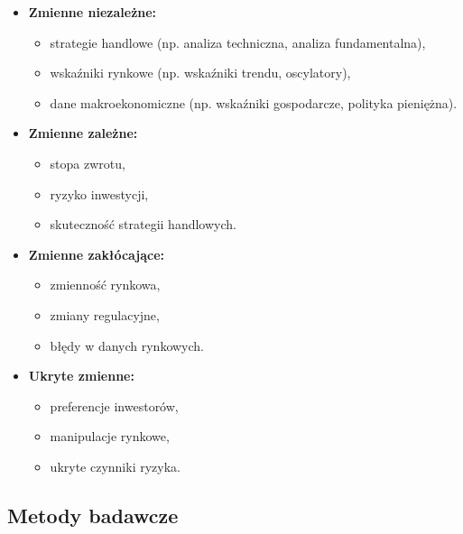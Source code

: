 \documentclass[polish,envcountsect,10pt]{article}
\begin{document}
\begin{itemize}
	\item \textbf{Zmienne niezależne:}
    \begin{itemize}
        \item strategie handlowe (np. analiza techniczna, analiza fundamentalna),
        \item wskaźniki rynkowe (np. wskaźniki trendu, oscylatory),
        \item dane makroekonomiczne (np. wskaźniki gospodarcze, polityka pieniężna).
    \end{itemize}
	\item \textbf{Zmienne zależne:}
    \begin{itemize}
        \item stopa zwrotu,
        \item ryzyko inwestycji,
        \item skuteczność strategii handlowych.
    \end{itemize}
	\item \textbf{Zmienne zakłócające:}
    \begin{itemize}
        \item zmienność rynkowa,
        \item zmiany regulacyjne,
        \item błędy w danych rynkowych.
    \end{itemize}
    \item \textbf{Ukryte zmienne:}
    \begin{itemize}
        \item preferencje inwestorów,
        \item manipulacje rynkowe,
        \item ukryte czynniki ryzyka.
    \end{itemize}
\end{itemize}

\subsection{Metody badawcze}
\end{document}
